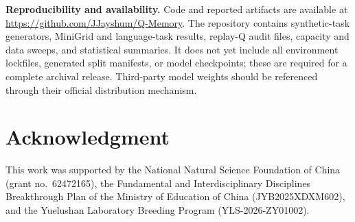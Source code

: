 \documentclass{article}
\begin{document}
\textbf{Reproducibility and availability.} Code and reported artifacts are available at \url{https://github.com/JJayshum/Q-Memory}. The repository contains synthetic-task generators, MiniGrid and language-task results, replay-Q audit files, capacity and data sweeps, and statistical summaries. It does not yet include all environment lockfiles, generated split manifests, or model checkpoints; these are required for a complete archival release. Third-party model weights should be referenced through their official distribution mechanism.

\section{Acknowledgment}
This work was supported by the National Natural Science Foundation of China (grant no.~62472165), the Fundamental and Interdisciplinary Disciplines Breakthrough Plan of the Ministry of Education of China (JYB2025XDXM602), and the Yuelushan Laboratory Breeding Program (YLS-2026-ZY01002).
\end{document}
